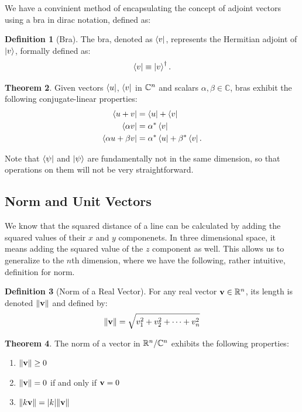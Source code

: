 \documentclass[12pt]{article}
\theoremstyle{definition}
\newtheorem{theorem}{Theorem}[section]
\newtheorem{definition}[theorem]{Definition}
\begin{document}
We have a convinient method of encapsulating the concept of adjoint vectors using a bra in dirac notation, defined as:

\begin{definition}[Bra]
The bra, denoted as $\bra{v}$, represents the Hermitian adjoint of $\ket{v}$, formally defined as:
\[
\bra{v} \equiv \ket{v}^\dagger.
\]
\end{definition}

\begin{theorem}
    Given vectors $\bra{u}$, $\bra{v}$ in $\mathbb{C}^n$ and scalars $\alpha, \beta \in \mathbb{C}$, bras exhibit the following conjugate-linear properties:
        \begin{align}
        \bra{u + v} &= \bra{u} + \bra{v}\\
        \bra{\alpha v} &= \alpha^* \bra{v}\\
        \bra{\alpha u + \beta v} &= \alpha^* \bra{u} + \beta^* \bra{v}.
        \end{align}
\end{theorem}

Note that $\bra{\psi}$ and $\ket{\psi}$ are fundamentally not in the same dimension, so that operations on them will not be very straightforward. 

\subsection{Norm and Unit Vectors}

We know that the squared distance of a line can be calculated by adding the squared values of their $x$ and $y$ componenets. In three dimensional space, it means adding the squared value of the $z$ component as well. This allows us to generalize to the $n$th dimension, where we have the following, rather intuitive, definition for norm. 

\begin{definition}[Norm of a Real Vector]
    For any real vector $\mathbf{v} \in \mathbb{R}^n$, its length is denoted $\left\lVert \mathbf{v} \right\rVert$ and defined by: $$\left\lVert \mathbf{v} \right\rVert = \sqrt{v_1^2 + v_2^2 + \cdots + v_n^2}$$
\end{definition}


\begin{theorem}
    The norm of a vector in $\mathbb{R}^n/\mathbb{C}^n$ exhibits the following properties:
    \begin{enumerate}
        \item $\norm{\mathbf{v}} \geq 0$
        \item $\norm{\mathbf{v}} = 0$ if and only if $\mathbf{v} = 0$
        \item $\norm{k \mathbf{v}} = \abs{k} \norm{\mathbf{v}}$
    \end{enumerate} 
\end{theorem}
\end{document}
